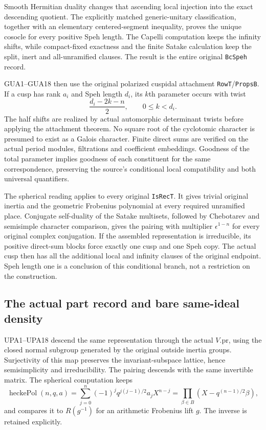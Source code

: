 \documentclass[11pt,a4paper]{article}
\numberwithin{equation}{section}
\theoremstyle{remark}\newtheorem{remark}[theorem]{Remark}
\begin{document}
Smooth Hermitian duality changes that ascending local injection
into the exact descending quotient.  The explicitly matched
generic-unitary classification, together with an elementary
centered-segment inequality, proves the unique cosocle for every
positive Speh length.  The Capelli computation keeps the infinity
shifts, while compact-fixed exactness and the finite Satake
calculation keep the split, inert and all-unramified clauses.
The result is the entire original \texttt{Bc\allowbreak Speh} record.

GUA1--GUA18 then use the original polarized cuspidal attachment
\texttt{Row\allowbreak T}/\texttt{Props\allowbreak B}.  If a cusp has rank $a_i$ and
Speh length $d_i$, its $k$th parameter occurs with twist
\[
                 \frac{d_i-2k-n}{2},\qquad 0\le k<d_i.
\]
The half shifts are realized by actual automorphic determinant
twists before applying the attachment theorem.  No square root of
the cyclotomic character is presumed to exist as a Galois character.
Finite direct sums are verified on the actual period modules,
filtrations and coefficient embeddings.  Goodness of the total
parameter implies goodness of each constituent for the same
correspondence, preserving the source's conditional local
compatibility and both universal quantifiers.

The spherical reading applies to every original \texttt{Is\allowbreak Rec\allowbreak T}.
It gives trivial original inertia and the geometric Frobenius
polynomial at every required unramified place.  Conjugate
self-duality of the Satake multisets, followed by Chebotarev and
semisimple character comparison, gives the pairing with multiplier
$\epsilon^{1-n}$ for every original complex conjugation.
If the assembled representation is irreducible, its positive
direct-sum blocks force exactly one cusp and one Speh copy.  The
actual cusp then has all the additional local and infinity clauses
of the original endpoint.  Speh length one is a conclusion of this
conditional branch, not a restriction on the construction.

\subsection{The actual part record and bare same-ideal density}

UPA1--UPA18 descend the same representation through the actual
$V.\mathrm{pr}$, using the closed normal subgroup generated by
the original outside inertia groups.  Surjectivity of this map
preserves the invariant-subspace lattice, hence semisimplicity and
irreducibility.  The pairing descends with the same invertible
matrix.  The spherical computation keeps
\[
 \operatorname{heckePol}(n,q,a)
   =\sum_{j=0}^n(-1)^jq^{j(j-1)/2}a_jX^{n-j}
   =\prod_{\beta\in B}(X-q^{(n-1)/2}\beta),
\]
and compares it to $R(g^{-1})$ for an arithmetic Frobenius lift
$g$.  The inverse is retained explicitly.
\end{document}
